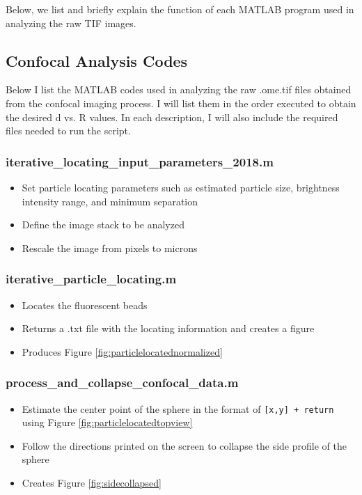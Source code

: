 Below, we list and briefly explain the function of each MATLAB program used in analyzing the raw TIF images.


\def\code#1{\texttt{#1}}

\subsection{Confocal Analysis Codes}
Below I list the MATLAB codes used in analyzing the raw .ome.tif files obtained from the confocal imaging process. I will list them in the order executed to obtain the desired d vs. R values. In each description, I will also include the required files needed to run the script.

\subsubsection*{iterative\_locating\_input\_parameters\_2018.m}
\begin{itemize}
	\item Set particle locating parameters such as estimated particle size, brightness intensity range, and minimum separation
	\item Define the image stack to be analyzed
	\item Rescale the image from pixels to microns
\end{itemize}
\subsubsection*{iterative\_particle\_locating.m}
\begin{itemize}
	\item Locates the fluorescent beads
	\item Returns a .txt file with the locating information and creates a figure 
	\item Produces Figure \ref{fig:particlelocatednormalized}
\end{itemize}
\subsubsection*{process\_and\_collapse\_confocal\_data.m}
\begin{itemize}
	\item Estimate the center point of the sphere in the format of \code{[x,y] + return} using Figure \ref{fig:particlelocatedtopview}
	\item Follow the directions printed on the screen to collapse the side profile of the sphere
	\item Creates Figure \ref{fig:sidecollapsed}
\end{itemize}
